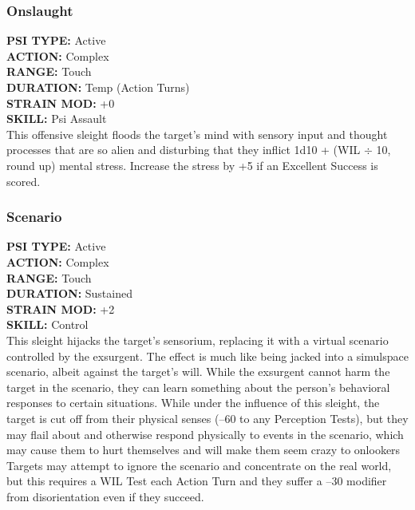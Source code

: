 \subsubsection{Onslaught} \textbf{PSI TYPE:} Active \\ \textbf{ACTION:} Complex \\ \textbf{RANGE:} Touch \\ \textbf{DURATION:} Temp (Action Turns) \\ \textbf{STRAIN MOD:} +0 \\ \textbf{SKILL:} Psi Assault \\ This offensive sleight floods the target's mind with sensory input and thought processes that are so alien and disturbing that they inflict 1d10 + (WIL $\div$ 10, round up) mental stress. Increase the stress by +5 if an Excellent Success is scored. 

\subsubsection{Scenario } \textbf{PSI TYPE:} Active \\ \textbf{ACTION:} Complex \\ \textbf{RANGE:} Touch \\ \textbf{DURATION:} Sustained \\ \textbf{STRAIN MOD:} +2 \\ \textbf{SKILL:} Control \\ This sleight hijacks the target's sensorium, replacing it with a virtual scenario controlled by the exsurgent. The effect is much like being jacked into a simulspace scenario, albeit against the target's will. While the exsurgent cannot harm the target in the scenario, they can learn something about the person's behavioral responses to certain situations. While under the influence of this sleight, the target is cut off from their physical senses (–60 to any Perception Tests), but they may flail about and otherwise respond physically to events in the scenario, which may cause them to hurt themselves and will make them seem crazy to onlookers Targets may attempt to ignore the scenario and concentrate on the real world, but this requires a WIL Test each Action Turn and they suffer a –30 modifier from disorientation even if they succeed. 

